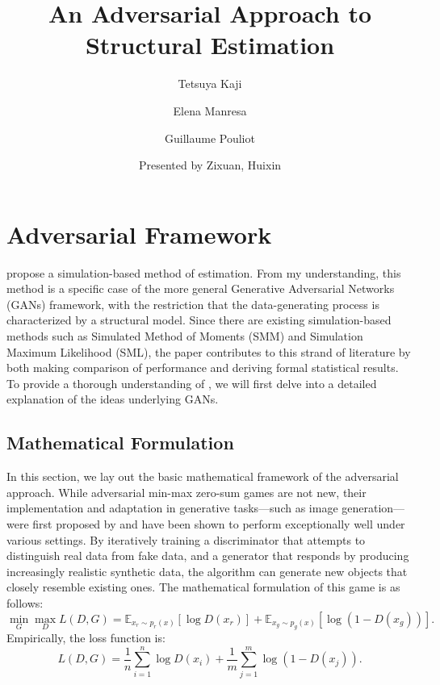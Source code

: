 \documentclass[12pt]{article}
\title{\small{\textbf{An Adversarial Approach to Structural Estimation}}}
\author{Tetsuya Kaji \and Elena Manresa \and Guillaume Pouliot}
\date{Presented by Zixuan, Huixin}
\begin{document}
\maketitle




\section{Adversarial Framework} \label{sec:framework}

\citet{kaji2023adversarial} propose a simulation-based method of estimation. From my understanding, this method is a specific case of the more general Generative Adversarial Networks (GANs) framework, with the restriction that the data-generating process is characterized by a structural model. Since there are existing simulation-based methods such as Simulated Method of Moments (SMM) and Simulation Maximum Likelihood (SML), the paper contributes to this strand of literature by both making comparison of performance and deriving formal statistical results. To provide a thorough understanding of \citet{kaji2023adversarial}, we will first delve into a detailed explanation of the ideas underlying GANs.

\subsection{Mathematical Formulation} \label{subsec:math_formulation}
In this section, we lay out the basic mathematical framework of the adversarial
approach. While adversarial min-max zero-sum games are not new, their
implementation and adaptation in generative tasks—such as image generation—were
first proposed by \citet{goodfellow2014generative} and have been shown to
perform exceptionally well under various settings. By iteratively training a
discriminator that attempts to distinguish real data from fake data, and a
generator that responds by producing increasingly realistic synthetic data, the
algorithm can generate new objects that closely resemble existing ones. The
mathematical formulation of this game is as follows:
\begin{equation} \label{eq:gan_objective}
    \min_G \max_D L(D, G)
    = \mathbb{E}_{x_r \sim p_{r}(x)} [\log D(x_r)] + \mathbb{E}_{x_g \sim p_g(x)} [\log(1 - D(x_g))].
\end{equation}
Empirically, the loss function is:
\begin{equation}\label{eq:empirical_loss}
    L(D, G) = \frac{1}{n} \sum_{i=1}^n \log D(x_i) + \frac{1}{m} \sum_{j=1}^m \log (1-D(x_j)).
\end{equation}
\end{document}
